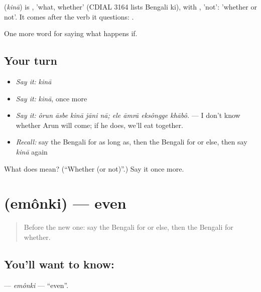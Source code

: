 \begin{cousinweb}
\textbf{} (\emph{kinā}) is , 'what, whether' (CDIAL 3164 lists Bengali ki), with , 'not': 'whether or not'. It comes after the verb it questions:  .
\end{cousinweb}

\begin{grammarlens}[title={What you've built}]
One more word for saying what happens if.
\end{grammarlens}

\subsection*{Your turn}
\begin{itemize}
\raggedright
  \item \emph{Say it:} \emph{kinā}
  \item \emph{Say it:} \emph{kinā}, once more
  \item \emph{Say it:} \emph{ôrun āsbe kinā jāni nā; ele āmrā eksôngge khābô.} — I don't know whether Arun will come; if he does, we'll eat together.
  \item \emph{Recall:} say the Bengali for as long as, then the Bengali for or else, then say \emph{kinā} again
\end{itemize}

\begin{tcolorbox}[breakable,colback=teal!4,colframe=teal!35!black,title={Before you move on}]
What does  mean? (\textquotedblleft{}Whether (or not)\textquotedblright{}.) Say it once more.
\end{tcolorbox}
\section[\texorpdfstring{\bn{এমনকি} (emônki)}{এমনকি (emônki)}]{ (emônki) — even}

\label{lesson:BN-C369-emonki}



\begin{quote}
Before the new one: say the Bengali for or else, then the Bengali for whether.
\end{quote}

\subsection*{You'll want to know: }
\textbf{} — \emph{emônki} — \textquotedblleft{}even\textquotedblright{}.

